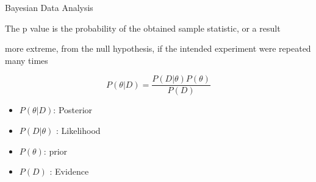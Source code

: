 
Bayesian Data Analysis


The p value is the probability of the obtained sample statistic, or a result 

more extreme, from the null hypothesis, if the intended experiment were repeated many times

\[ P(\theta|D ) = \frac{P(D|\theta)P(\theta)}{P(D)} \]



\begin{itemize}
\item $P(\theta|D )$: Posterior
\item $P(D|\theta)$ : Likelihood
\item $P(\theta)$: prior 

\item $P(D)$ :  Evidence
\end{itemize}




